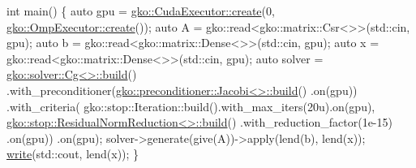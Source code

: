 \begin{DoxyCodeInclude}
\textcolor{keywordtype}{int} main()
\{
    \textcolor{keyword}{auto} gpu = \hyperlink{classgko_1_1CudaExecutor_a2718a92034350650ef406ffdb60db090}{gko::CudaExecutor::create}(0, 
      \hyperlink{classgko_1_1OmpExecutor_a33ca05fdd0fc928ee262fc9425304874}{gko::OmpExecutor::create}());
    \textcolor{keyword}{auto} A = gko::read<gko::matrix::Csr<>>(std::cin, gpu);
    \textcolor{keyword}{auto} b = gko::read<gko::matrix::Dense<>>(std::cin, gpu);
    \textcolor{keyword}{auto} x = gko::read<gko::matrix::Dense<>>(std::cin, gpu);
    \textcolor{keyword}{auto} solver =
        \hyperlink{classgko_1_1solver_1_1Cg}{gko::solver::Cg<>::build}()
            .with\_preconditioner(\hyperlink{classgko_1_1preconditioner_1_1Jacobi}{gko::preconditioner::Jacobi<>::build}()
      .on(gpu))
            .with\_criteria(
                gko::stop::Iteration::build().with\_max\_iters(20u).on(gpu),
                \hyperlink{classgko_1_1stop_1_1ResidualNormReduction}{gko::stop::ResidualNormReduction<>::build}()
                    .with\_reduction\_factor(1e-15)
                    .on(gpu))
            .on(gpu);
    solver->generate(give(A))->apply(lend(b), lend(x));
    \hyperlink{namespacegko_a859dc47a462721d83728d91ab7fa2148}{write}(std::cout, lend(x));
\}
\end{DoxyCodeInclude}
 